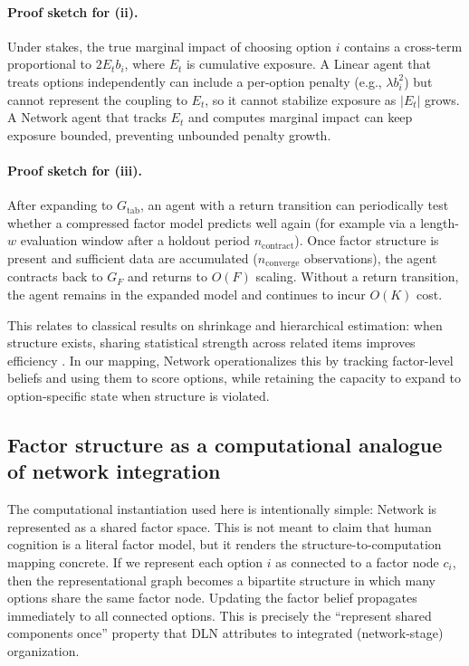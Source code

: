 \documentclass[11pt]{article}
\begin{document}
\paragraph{Proof sketch for (ii).}
Under stakes, the true marginal impact of choosing option $i$ contains a
cross-term proportional to $2E_t b_i$, where $E_t$ is cumulative exposure.  A
Linear agent that treats options independently can include a per-option penalty
(e.g., $\lambda b_i^2$) but cannot represent the coupling to $E_t$, so it cannot
stabilize exposure as $|E_t|$ grows.  A Network agent that tracks $E_t$ and
computes marginal impact can keep exposure bounded, preventing unbounded penalty
growth.

\paragraph{Proof sketch for (iii).}
After expanding to $G_{\mathrm{tab}}$, an agent with a return transition can
periodically test whether a compressed factor model predicts well again (for
example via a length-$w$ evaluation window after a holdout period
$n_{\mathrm{contract}}$).  Once factor structure is present and sufficient data
are accumulated ($n_{\mathrm{converge}}$ observations), the agent contracts back
to $G_F$ and returns to $O(F)$ scaling.  Without a return transition, the agent
remains in the expanded model and continues to incur $O(K)$ cost.


This relates to classical results on shrinkage and hierarchical estimation: when structure exists, sharing statistical strength across related items improves efficiency \cite{JamesStein1961,EfronMorris1977}. In our mapping, Network operationalizes this by tracking factor-level beliefs and using them to score options, while retaining the capacity to expand to option-specific state when structure is violated.

\subsection{Factor structure as a computational analogue of network integration}

The computational instantiation used here is intentionally simple: Network is represented as a shared factor space. This is not meant to claim that human cognition is a literal factor model, but it renders the structure-to-computation mapping concrete. If we represent each option $i$ as connected to a factor node $c_i$, then the representational graph becomes a bipartite structure in which many options share the same factor node. Updating the factor belief propagates immediately to all connected options. This is precisely the ``represent shared components once'' property that DLN attributes to integrated (network-stage) organization.
\end{document}
